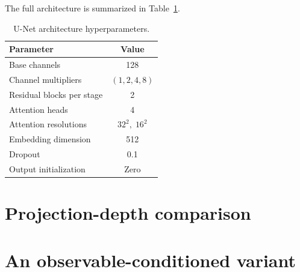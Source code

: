\documentclass[linenumbers,trackchanges, twocolumn]{aastex701}
\begin{document}
The full architecture is summarized in Table~\ref{tab:architecture}.

\begin{table}
\centering
\caption{U-Net architecture hyperparameters.}
\label{tab:architecture}
\begin{tabular}{lc}
\hline
Parameter & Value \\
\hline
Base channels              & 128 \\
Channel multipliers        & $(1, 2, 4, 8)$ \\
Residual blocks per stage  & 2 \\
Attention heads            & 4 \\
Attention resolutions      & $32^2,\;16^2$ \\
Embedding dimension        & 512 \\
Dropout                    & 0.1 \\
Output initialization      & Zero \\
\hline
\end{tabular}
\end{table}




\section{Projection-depth comparison}\label{cube_comp}

\section{An observable-conditioned variant}\label{appendix:obs}


{}



\end{document}

